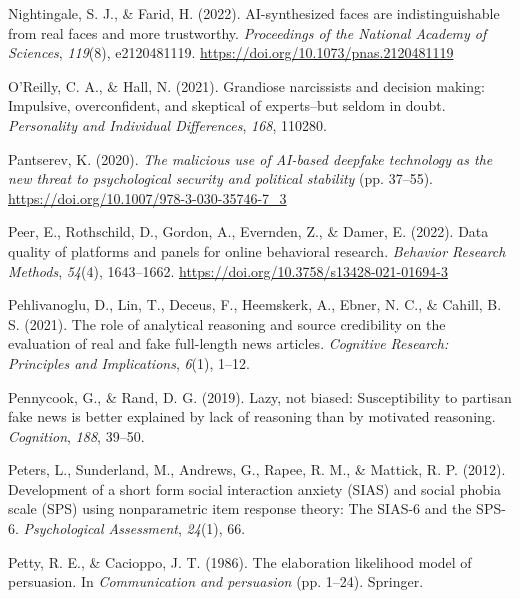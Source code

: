 \documentclass[
  man,mask,floatsintext]{apa6}
\newlength{\cslhangindent}
\newlength{\cslentryspacingunit} %
\newenvironment{CSLReferences}[2] %
 {%
  \setlength{\parindent}{0pt}
  \ifodd #1
  \let\oldpar\par
  \def\par{\hangindent=\cslhangindent\oldpar}
  \fi
  \setlength{\parskip}{#2\cslentryspacingunit}
 }%
 {}
\begin{document}
\begin{CSLReferences}{1}{0}
\leavevmode{}%
Nightingale, S. J., \& Farid, H. (2022). AI-synthesized faces are indistinguishable from real faces and more trustworthy. \emph{Proceedings of the National Academy of Sciences}, \emph{119}(8), e2120481119. \url{https://doi.org/10.1073/pnas.2120481119}

\leavevmode{}%
O'Reilly, C. A., \& Hall, N. (2021). Grandiose narcissists and decision making: Impulsive, overconfident, and skeptical of experts--but seldom in doubt. \emph{Personality and Individual Differences}, \emph{168}, 110280.

\leavevmode{}%
Pantserev, K. (2020). \emph{The malicious use of AI-based deepfake technology as the new threat to psychological security and political stability} (pp. 37--55). \url{https://doi.org/10.1007/978-3-030-35746-7_3}

\leavevmode{}%
Peer, E., Rothschild, D., Gordon, A., Evernden, Z., \& Damer, E. (2022). Data quality of platforms and panels for online behavioral research. \emph{Behavior Research Methods}, \emph{54}(4), 1643--1662. \url{https://doi.org/10.3758/s13428-021-01694-3}

\leavevmode{}%
Pehlivanoglu, D., Lin, T., Deceus, F., Heemskerk, A., Ebner, N. C., \& Cahill, B. S. (2021). The role of analytical reasoning and source credibility on the evaluation of real and fake full-length news articles. \emph{Cognitive Research: Principles and Implications}, \emph{6}(1), 1--12.

\leavevmode{}%
Pennycook, G., \& Rand, D. G. (2019). Lazy, not biased: Susceptibility to partisan fake news is better explained by lack of reasoning than by motivated reasoning. \emph{Cognition}, \emph{188}, 39--50.

\leavevmode{}%
Peters, L., Sunderland, M., Andrews, G., Rapee, R. M., \& Mattick, R. P. (2012). Development of a short form social interaction anxiety (SIAS) and social phobia scale (SPS) using nonparametric item response theory: The SIAS-6 and the SPS-6. \emph{Psychological Assessment}, \emph{24}(1), 66.

\leavevmode{}%
Petty, R. E., \& Cacioppo, J. T. (1986). The elaboration likelihood model of persuasion. In \emph{Communication and persuasion} (pp. 1--24). Springer.


\end{CSLReferences}
\end{document}
